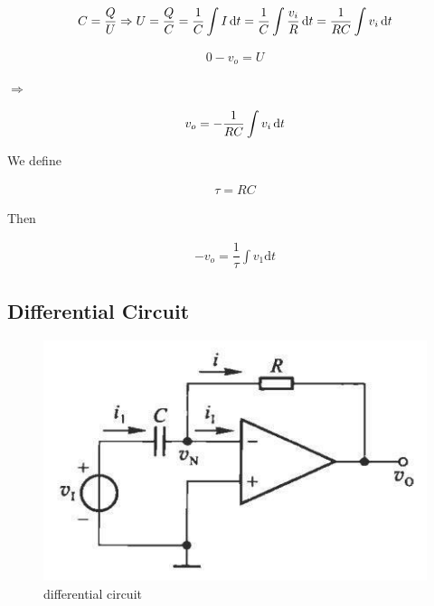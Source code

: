 \begin{equation*}
  \begin{aligned}
    C = \dfrac{Q}{U} \Rightarrow U = \dfrac{Q}{C} = \dfrac{1}{C} \int I \mathop{}\!\mathrm{d} t = \dfrac{1}{C} \int \dfrac{v_i}{R} \mathop{}\!\mathrm{d} t = \dfrac{1}{RC} \int v_i \mathop{}\!\mathrm{d} t
  \end{aligned}
\end{equation*}

\begin{equation*}
  \begin{aligned}
    0 - v_o = U
  \end{aligned}
\end{equation*}

$\Rightarrow$

\begin{equation*}
  \begin{aligned}
    v_o = - \dfrac{1}{RC} \int v_i \mathop{}\!\mathrm{d} t
  \end{aligned}
\end{equation*}

We define

\begin{equation*}
  \begin{aligned}
    \tau = RC
  \end{aligned}
\end{equation*}

Then

\begin{equation*}
  \begin{aligned}
    - v_o = \dfrac{1}{\tau} \int v_{1} \mathrm{d} t
  \end{aligned}
\end{equation*}

\subsection{Differential Circuit}

\begin{figure}[H]
  \centering
  \includegraphics[width=0.6\linewidth]{figures/differential-circuit}
  \caption{differential circuit}
\end{figure}

